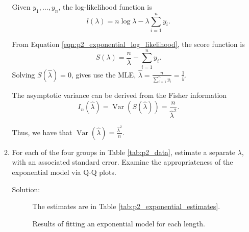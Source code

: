 \documentclass[letterpaper,11pt]{article}
\begin{document}
\begin{enumerate}
\begin{enumerate}
      Given $y_1,\ldots,y_n$, the log-likelihood function is
      \begin{equation}
        l\left(\lambda\right) = n\log\lambda - \lambda\sum_{i=1}^n y_i.
        \label{eqn:p2_exponential_log_likelihood}
      \end{equation}

      From Equation \ref{eqn:p2_exponential_log_likelihood}, the score function is
      \begin{equation}
        S\left(\lambda\right) = \frac{n}{\lambda} - \sum_{i=1}^n y_i.
        \label{eqn:p2_exponential_score}
      \end{equation}
      Solving $S\left(\hat{\lambda}\right) = 0$, gives use the MLE,
      $\boxed{\hat{\lambda} = \frac{n}{\sum_{i=1}^n y_i} = \frac{1}{\bar{y}}.}$

      The asymptotic variance can be derived from the Fisher information
      \begin{equation}
        I_n\left(\hat{\lambda}\right)
        = \operatorname{Var}\left(S\left(\hat{\lambda}\right)\right)
        = \frac{n}{\hat{\lambda}^2}.
      \end{equation}

      Thus, we have that
      $\boxed{\operatorname{Var}\left(\hat{\lambda}\right) =
        \frac{\hat{\lambda}^2}{n}.}$      
      
    \item For each of the four groups in Table \ref{tab:p2_data}, estimate a
      separate $\lambda$, with an associated standard error. Examine the
      appropriateness of the exponential model via Q-Q plots.

      \begin{description}
      \item[Solution:] The estimates are in Table
        \ref{tab:p2_exponential_estimates}.

        \begin{table}
          \centering
          
          \caption{Results of fitting an exponential model for each length.}
          \label{tab:p2_exponential_estimates}
        \end{table}
      \end{description}
    \end{enumerate}
\end{enumerate}
\end{document}
